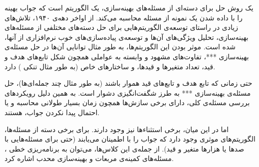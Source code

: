 یک روش حل
برای دسته‌ای از مسئله‌های بهینه‌سازی، یک الگوریتم
 است که جواب بهینه را با داده شدن یک نمونه از مسئله‌
محاسبه می‌کند. از اواخر دهه‌ی ۱۹۴۰، تلاش‌های زیادی در راستای توسعه‌ی الگوریتم‌هایی برای حل دسته‌های مختلفی از مسئله‌های بهینه‌سازی، تحلیل ویژگی‌های آن‌ها و توسعه‌ی پیاده‌سازی‌های خوب نرم‌افزاری از آنها، شده است. موثر بودن این الگوریتم‌ها، به طور مثال توانایی آن‌ها در حل مسئله‌ی بهینه‌سازی ***، تفاوت‌های مشهود و وابسته به عواملی همچون شکل تابع‌های هدف و قید، تعداد متغیرها و قیدها، و ساختارهای خاص (به طور مثال تنکی
) 
دارد.


حتی زمانی که تابع هدف و تابع‌های قید هموار
باشند (به طور مثال چند جمله‌ای‌ها)، حل مسئله‌ی بهینه‌سازی *** به طرز شگفت‌انگیزی دشوار است. به همین دلیل رویکردهای بررسی مسئله‌ی کلی، دارای برخی سازش‌ها
همچون زمان بسیار طولانی محاسبه و یا احتمال پیدا نکردن جواب، هستند.


اما در این میان، برخی استثناء‌ها نیز وجود دارند. برای برخی دسته از مسئله‌ها، الگوریتم‌های موثری وجود دارد که جواب را با اطمینان می‌یابند (حتی برای مسئله‌هایی با صدها یا هزارها متغیر و قید). از جمله‌ی این کلاس‌ها، می‌توان به برنامه‌ریزی خطی
، 
مسئله‌های کمینه‌ی مربعات
و بهینه‌سازی محدب اشاره کرد.




































